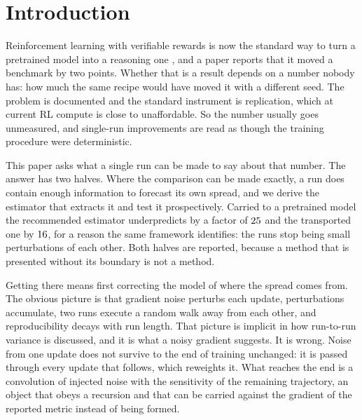\section{Introduction}
\label{sec:introduction}

Reinforcement learning with verifiable rewards is now the standard way to turn a pretrained
model into a reasoning one \citep{deepseekr1}, and a paper reports that it moved a benchmark by two
points. Whether
that is a result depends on a number nobody has: how much the same recipe would have moved it with
a different seed. The problem is documented \citep{henderson2018matters, hochlehnert2025sober} and
the standard instrument is replication, which at current RL compute is close to
unaffordable. So the number usually goes unmeasured, and single-run improvements are read as
though the training procedure were deterministic.

This paper asks what a single run can be made to say about that number. The answer has two halves.
Where the comparison can be made exactly, a run does contain enough information to forecast its own
spread, and we derive the estimator that extracts it and test it prospectively. Carried to a
pretrained model the recommended estimator underpredicts by a factor of $25$ and the
transported one by $16$, for a reason the same framework identifies:
the runs stop being small perturbations of each other. Both halves are reported, because a method
that is presented without its boundary is not a method.

Getting there means first correcting the model of where the spread comes from. The obvious picture
is that gradient noise perturbs each update, perturbations accumulate, two runs execute a random
walk away from each other, and reproducibility decays with run length. That picture is implicit in
how run-to-run variance is discussed, and it is what a noisy gradient suggests. It is wrong. Noise
from one update does not survive to the end of training unchanged: it is passed through every
update that follows, which reweights it. What reaches the end is a convolution of injected noise
with the sensitivity of the remaining trajectory, an object that obeys a recursion and that can
be carried against the gradient of the reported metric instead of being formed.

